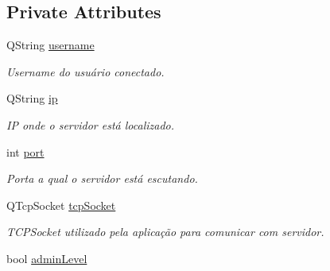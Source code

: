 \subsection*{Private Attributes}
\begin{DoxyCompactItemize}
\item 
Q\+String \hyperlink{classMyCalcWindow_aaa828b24dd233138d200de623762e95c}{username}\hypertarget{classMyCalcWindow_aaa828b24dd233138d200de623762e95c}{}\label{classMyCalcWindow_aaa828b24dd233138d200de623762e95c}

\begin{DoxyCompactList}\small\item\em Username do usuário conectado. \end{DoxyCompactList}\item 
Q\+String \hyperlink{classMyCalcWindow_a9b84a818b4419182b414bfa93cfe9d66}{ip}\hypertarget{classMyCalcWindow_a9b84a818b4419182b414bfa93cfe9d66}{}\label{classMyCalcWindow_a9b84a818b4419182b414bfa93cfe9d66}

\begin{DoxyCompactList}\small\item\em IP onde o servidor está localizado. \end{DoxyCompactList}\item 
int \hyperlink{classMyCalcWindow_a48dd1d98f83d224a788c8592929cd6a5}{port}\hypertarget{classMyCalcWindow_a48dd1d98f83d224a788c8592929cd6a5}{}\label{classMyCalcWindow_a48dd1d98f83d224a788c8592929cd6a5}

\begin{DoxyCompactList}\small\item\em Porta a qual o servidor está escutando. \end{DoxyCompactList}\item 
Q\+Tcp\+Socket \hyperlink{classMyCalcWindow_aa07c81871dc4b11ab83324b544d66733}{tcp\+Socket}\hypertarget{classMyCalcWindow_aa07c81871dc4b11ab83324b544d66733}{}\label{classMyCalcWindow_aa07c81871dc4b11ab83324b544d66733}

\begin{DoxyCompactList}\small\item\em T\+C\+P\+Socket utilizado pela aplicação para comunicar com servidor. \end{DoxyCompactList}\item 
bool \hyperlink{classMyCalcWindow_a80f22185e35ea4a28825b0d2518df67c}{admin\+Level}\hypertarget{classMyCalcWindow_a80f22185e35ea4a28825b0d2518df67c}{}\label{classMyCalcWindow_a80f22185e35ea4a28825b0d2518df67c}


\end{DoxyCompactItemize}
